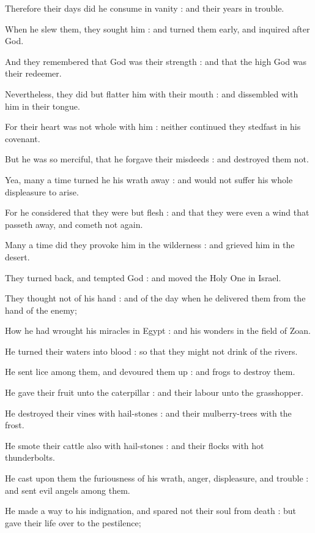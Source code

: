 Therefore their days did he consume in vanity : and their years in trouble.\par
{}When he slew them, they sought him : and turned them early, and inquired after God.\par
{}And they remembered that God was their strength : and that the high God was their redeemer.\par
{}Nevertheless, they did but flatter him with their mouth : and dissembled with him in their tongue.\par
{}For their heart was not whole with him : neither continued they stedfast in his covenant.\par
{}But he was so merciful, that he forgave their misdeeds : and destroyed them not.\par
{}Yea, many a time turned he his wrath away : and would not suffer his whole displeasure to arise.\par
{}For he considered that they were but flesh : and that they were even a wind that passeth away, and cometh not again.\par
{}Many a time did they provoke him in the wilderness : and grieved him in the desert.\par
{}They turned back, and tempted God : and moved the Holy One in Israel.\par
{}They thought not of his hand : and of the day when he delivered them from the hand of the enemy;\par
{}How he had wrought his miracles in Egypt : and his wonders in the field of Zoan.\par
{}He turned their waters into blood : so that they might not drink of the rivers.\par
{}He sent lice among them, and devoured them up : and frogs to destroy them.\par
{}He gave their fruit unto the caterpillar : and their labour unto the grasshopper.\par
{}He destroyed their vines with hail-stones : and their mulberry-trees with the frost.\par
{}He smote their cattle also with hail-stones : and their flocks with hot thunderbolts.\par
{}He cast upon them the furiousness of his wrath, anger, displeasure, and trouble : and sent evil angels among them.\par
{}He made a way to his indignation, and spared not their soul from death : but gave their life over to the pestilence;\par
